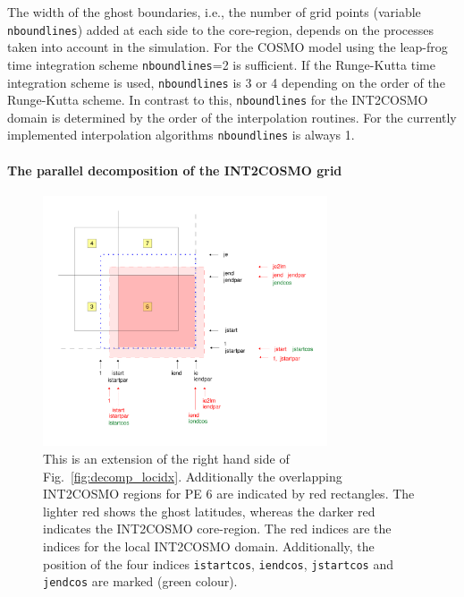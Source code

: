 \documentclass[11pt,twoside]{article}
\begin{document}
The width of the ghost boundaries, i.e., the number of grid points (variable
\verb|nboundlines|) added at each side to the core-region, depends on the 
processes taken into account in the simulation.
For the COSMO model using the leap-frog time integration scheme  
\verb|nboundlines|=2 is sufficient. If the Runge-Kutta time integration scheme
is used, \verb|nboundlines| is 3 or 4 depending on the order of the Runge-Kutta 
scheme.
In contrast to this, \verb|nboundlines| for the INT2COSMO domain is  
determined by the order of the interpolation routines. For the currently 
implemented interpolation algorithms  \verb|nboundlines| is always 1.

\paragraph{The parallel decomposition of the INT2COSMO grid\\}
\begin{figure}
\begin{center} 
\includegraphics[width=0.75\textwidth]{MMDUM_ixxxcos.pdf} 
\end{center} 
\vspace{-.8cm}
\caption{This is an extension of the right hand side of Fig.\ 
\ref{fig:decomp_locidx}.
Additionally the overlapping INT2COSMO regions for PE 6 are indicated by
red rectangles. The lighter red shows the ghost latitudes, 
whereas the darker red indicates the INT2COSMO core-region. The red indices
are the indices for the local INT2COSMO domain. Additionally, the position
of the four indices  {\tt istartcos}, {\tt iendcos}, {\tt jstartcos} and 
{\tt jendcos} are marked (green colour).}
\label{fig:ixxxcos} 
\end{figure} 
\end{document}
